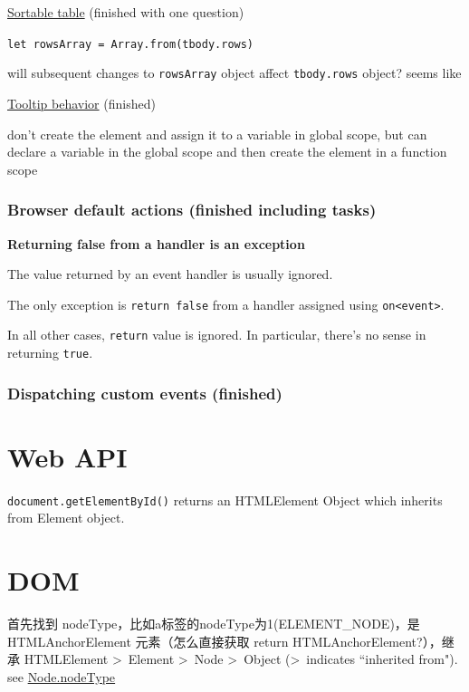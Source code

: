 \documentclass[a4paper, 12pt]{article}
\begin{document}
\href{https://javascript.info/event-delegation#sortable-table}{Sortable table} (finished with one question)

\verb|let rowsArray = Array.from(tbody.rows)|

will subsequent changes to \verb|rowsArray| object affect \verb|tbody.rows| object? seems like

\href{https://javascript.info/event-delegation#tooltip-behavior}{Tooltip behavior} (finished)

don't create the element and assign it to a variable in global scope, but can declare a variable in the global scope and then create the element in a function scope

\subsubsection{Browser default actions (finished including tasks)}
\textbf{Returning false from a handler is an exception}

The value returned by an event handler is usually ignored.

The only exception is \verb|return false| from a handler assigned using \verb|on<event>|.

In all other cases, \verb|return| value is ignored. In particular, there's no sense in returning \verb|true|.

\subsubsection{Dispatching custom events (finished)}



\section{Web API}
\verb|document.getElementById()| returns an HTMLElement Object which inherits from Element object.


\section{DOM}
首先找到 nodeType，比如a标签的nodeType为1(ELEMENT\_NODE)，是 HTMLAnchorElement 元素（怎么直接获取 return HTMLAnchorElement?），继承 HTMLElement \textgreater\ Element \textgreater\ Node \textgreater\ Object (\textgreater\ indicates ``inherited from").\\ see \href{https://developer.mozilla.org/en-US/docs/Web/API/Node/nodeType}{Node.nodeType}
\end{document}
